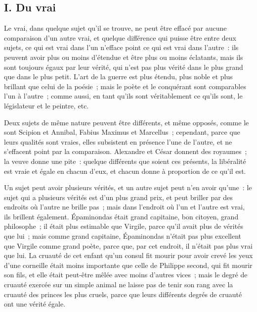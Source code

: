 \documentclass[french,twoside]{book} %
\begin{document}
\subsection[{I. Du vrai}]{I. Du vrai}
\noindent Le vrai, dans quelque sujet qu’il se trouve, ne peut être effacé par aucune comparaison d’un autre vrai, et quelque différence qui puisse être entre deux sujets, ce qui est vrai dans l’un n’efface point ce qui est vrai dans l’autre : ils peuvent avoir plus ou moins d’étendue et être plus ou moins éclatants, mais ils sont toujours égaux par leur vérité, qui n’est pas plus vérité dans le plus grand que dans le plus petit. L’art de la guerre est plus étendu, plus noble et plus brillant que celui de la poésie ; mais le poète et le conquérant sont comparables l’un à l’autre ; comme aussi, en tant qu’ils sont véritablement ce qu’ils sont, le législateur et le peintre, etc.\par
Deux sujets de même nature peuvent être différents, et même opposés, comme le sont Scipion et Annibal, Fabius Maximus et Marcellus ; cependant, parce que leurs qualités sont vraies, elles subsistent en présence l’une de l’autre, et ne s’effacent point par la comparaison. Alexandre et César donnent des royaumes ; la veuve donne une pite : quelque différents que soient ces présents, la libéralité est vraie et égale en chacun d’eux, et chacun donne à proportion de ce qu’il est.\par
Un sujet peut avoir plusieurs vérités, et un autre sujet peut n’en avoir qu’une : le sujet qui a plusieurs vérités est d’un plus grand prix, et peut briller par des endroits où l’autre ne brille pas ; mais dans l’endroit où l’un et l’autre est vrai, ils brillent également. Épaminondas était grand capitaine, bon citoyen, grand philosophe ; il était plus estimable que Virgile, parce qu’il avait plus de vérités que lui ; mais comme grand capitaine, Épaminondas n’était pas plus excellent que Virgile comme grand poète, parce que, par cet endroit, il n’était pas plus vrai que lui. La cruauté de cet enfant qu’un consul fit mourir pour avoir crevé les yeux d’une corneille était moins importante que celle de Philippe second, qui fit mourir son fils, et elle était peut-être mêlée avec moins d’autres vices ; mais le degré de cruauté exercée sur un simple animal ne laisse pas de tenir son rang avec la cruauté des princes les plus cruels, parce que leurs différents degrés de cruauté ont une vérité égale.\par
\end{document}
